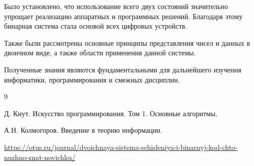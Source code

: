 \documentclass[a4paper, 12pt]{report}
\begin{document}
	Было установлено, что использование всего двух состояний значительно упрощает 
	реализацию аппаратных и программных решений. Благодаря этому бинарная система 
	стала основой всех цифровых устройств.
	
	Также были рассмотрены основные принципы представления чисел и данных в двоичном виде, 
	а также области применения данной системы.
	
	Полученные знания являются фундаментальными для дальнейшего изучения информатики, 
	программирования и смежных дисциплин.
	
	\begin{thebibliography}{9}
	\pagecolor{yellow!30}
		
		Д. Кнут. Искусство программирования. Том 1. Основные алгоритмы.
		
		А.Н. Колмогоров. Введение в теорию информации.
		
		\url{https://otus.ru/journal/dvoichnaya-sistema-schisleniya-i-binarnyj-kod-chto-nuzhno-znat-novichku/}
		
	\end{thebibliography}
	
\end{document}

